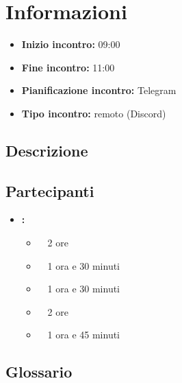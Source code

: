 \section{Informazioni}
\begin{itemize}
	\item \textbf{Inizio incontro:} 09:00
	\item \textbf{Fine incontro:} 11:00
	\item \textbf{Pianificazione incontro:} Telegram
	\item \textbf{Tipo incontro:} remoto (Discord)
\end{itemize}

\subsection{Descrizione}
\DocDescription

\subsection{Partecipanti}

\begin{itemize}
	\item \textbf{\GroupName:}
	\begin{itemize}
		\item \riccardo \ \rightarrow\ 2 ore
		\item \raul \ \rightarrow\ 1 ora e 30 minuti
		\item \martina \ \rightarrow\ 1 ora e 30 minuti
		\item \sebastiano \ \rightarrow\ 2 ore
		\item \mattia \ \rightarrow\ 1 ora e 45 minuti
	\end{itemize}
\end{itemize}

\subsection{Glossario}
\GlossarioIntroduzione

\clearpage